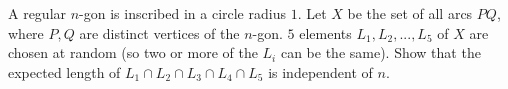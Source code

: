 A regular $n$-gon is inscribed in a circle radius $1$. Let $X$ be the set of all arcs $PQ$, where $P, Q$ are distinct vertices of the $n$-gon. $5$ elements $L_1, L_2, ... , L_5$ of $X$ are chosen at random (so two or more of the $L_i$ can be the same). Show that the expected length of $L_1 \cap L_2 \cap L_3 \cap L_4 \cap L_5$ is independent of $n$.
